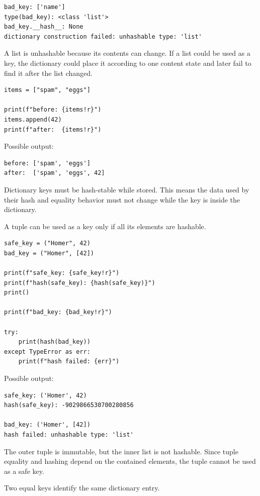 \begin{verbatim}
bad_key: ['name']
type(bad_key): <class 'list'>
bad_key.__hash__: None
dictionary construction failed: unhashable type: 'list'
\end{verbatim}

A list is unhashable because its contents can change. If a list could be used as a key, the dictionary could place it according to one content state and later fail to find it after the list changed.

\begin{verbatim}
items = ["spam", "eggs"]

print(f"before: {items!r}")
items.append(42)
print(f"after:  {items!r}")
\end{verbatim}

Possible output:

\begin{verbatim}
before: ['spam', 'eggs']
after:  ['spam', 'eggs', 42]
\end{verbatim}

Dictionary keys must be hash-stable while stored. This means the data used by their hash and equality behavior must not change while the key is inside the dictionary.

A tuple can be used as a key only if all its elements are hashable.

\begin{verbatim}
safe_key = ("Homer", 42)
bad_key = ("Homer", [42])

print(f"safe_key: {safe_key!r}")
print(f"hash(safe_key): {hash(safe_key)}")
print()

print(f"bad_key: {bad_key!r}")

try:
    print(hash(bad_key))
except TypeError as err:
    print(f"hash failed: {err}")
\end{verbatim}

Possible output:

\begin{verbatim}
safe_key: ('Homer', 42)
hash(safe_key): -9029866530700280856

bad_key: ('Homer', [42])
hash failed: unhashable type: 'list'
\end{verbatim}

The outer tuple is immutable, but the inner list is not hashable. Since tuple equality and hashing depend on the contained elements, the tuple cannot be used as a safe key.

Two equal keys identify the same dictionary entry.

